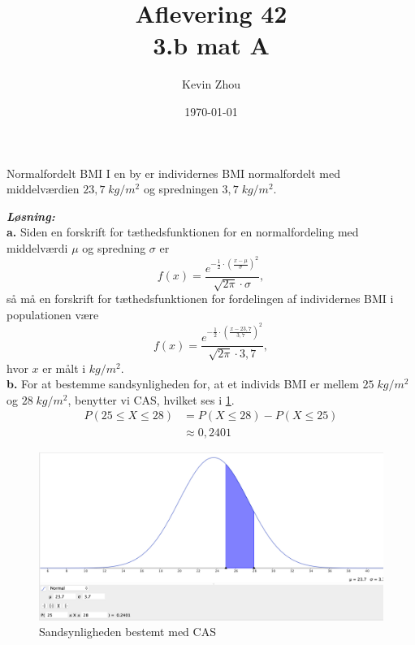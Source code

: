 \documentclass{article}
\title{Aflevering 42\\
{\Large \textbf{3.b mat A}}}
\author{Kevin Zhou}
\date{\today}
\newcommand{\sol}{\setlength{\parindent}{0cm}\textbf{\textit{Løsning:}}\setlength{\parindent}{1cm}}
\begin{document}
\maketitle
\newpage
\begin{question}{Normalfordelt BMI}{}
 I en by er individernes BMI normalfordelt med middelværdien $23,7 \;\unit{kg/m^2} $ og spredningen $3,7 \;\unit{kg/m^2} $. 
\end{question}
\sol \\
\textbf{a.}
Siden en forskrift for tæthedsfunktionen for en normalfordeling med middelværdi $\mu $ og spredning $\sigma $ er
\[
f(x)= \frac{e^{-\frac{1}{2} \cdot \left(\frac{x-\mu }{\sigma }\right) ^2} }{\sqrt{2 \pi } \cdot \sigma },
\] 
så må en forskrift for tæthedsfunktionen for fordelingen af individernes BMI i populationen være 
\[
f(x)= \frac{e^{-\frac{1}{2}\cdot \left(\frac{x-23,7}{3,7}\right) ^2} }{\sqrt{2 \pi } \cdot 3,7},
\] 
hvor $x$ er målt i $\unit{kg/m^2}$. \\[1ex]
\textbf{b.}
For at bestemme sandsynligheden for, at et individs BMI er mellem $25 \;\unit{kg/m^2} $ og $28 \;\unit{kg/m^2} $, benytter vi CAS, hvilket ses i \cref{fig:CASBMI}. 
\begin{equation*}
\begin{split}
  P(25 \leq X \leq 28) &=P(X \leq 28) - P(X \leq 25)\\
  &\approx 0,2401
\end{split}
\end{equation*}
\begin{figure}[H]
\begin{center}
  \includegraphics[width=\textwidth]{CASBMI.png}
\end{center}
\caption{Sandsynligheden bestemt med CAS}
\label{fig:CASBMI}
\end{figure}
\end{document}
